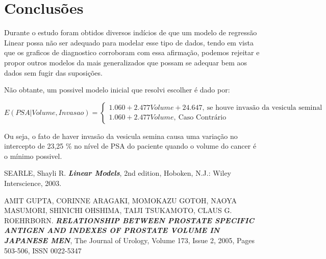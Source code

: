 \documentclass[runningheads]{llncs}\usepackage[]{graphicx}\usepackage[]{color}
\begin{document}
\section{Conclusões}
Durante o estudo foram obtidos diversos indícios de que um modelo de regressão Linear possa não ser adequado para modelar esse tipo de dados, tendo em vista que os graficos de diagnostico corroboram com essa afirmação, podemos rejeitar e propor outros modelos da mais generalizados que possam se adequar bem aos dados sem fugir das suposições.

Não obtante, um possivel modelo inicial que resolvi escolher é dado por:

  \[
    E(PSA|Volume, Invasao)=\begin{cases}
                1.060+2.477 Volume+24.647, \ \text{se houve invasão da vesicula seminal}\\
                1.060+2.477 Volume,  \ \text{Caso Contrário}
    \end{cases}
  \]
  
Ou seja, o fato de haver invasão da vesicula semina causa uma variação no intercepto de 23,25 \% no nível de PSA do paciente quando o volume do cancer é o mínimo possivel.

\newpage
\begin{thebibliography}{9}
  SEARLE, Shayli R.
  \textit{\textbf{Linear Models}},
  2nd edition,
  Hoboken, N.J.: Wiley Interscience,
  2003.

  AMIT GUPTA, CORINNE ARAGAKI, MOMOKAZU GOTOH, NAOYA MASUMORI, SHINICHI OHSHIMA, TAIJI TSUKAMOTO, CLAUS G. ROEHRBORN.
  \textit{\textbf{RELATIONSHIP BETWEEN PROSTATE SPECIFIC ANTIGEN AND INDEXES OF PROSTATE VOLUME IN JAPANESE MEN}},
The Journal of Urology,
Volume 173, Issue 2,
2005,
Pages 503-506,
ISSN 0022-5347
\end{thebibliography}
\newpage
\end{document}
